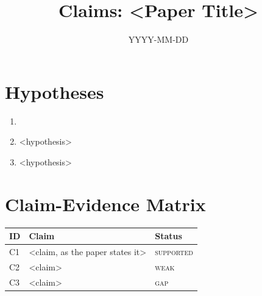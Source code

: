 \documentclass[11pt]{article}
\title{Claims: <Paper Title>}
\date{YYYY-MM-DD}
\newcommand{\status}[1]{\textsc{#1}}
\newcommand{\supported}{\textcolor{green!50!black}{\status{supported}}}
\newcommand{\weak}{\textcolor{orange!80!black}{\status{weak}}}
\newcommand{\gap}{\textcolor{red!70!black}{\status{gap}}}
\begin{document}
\maketitle

\section*{Hypotheses}

\begin{enumerate}
\item[\textbf{H1.}] <venue-neutral hypothesis statement>
\item[\textbf{H2.}] <hypothesis>
\item[\textbf{H3.}] <hypothesis>
\end{enumerate}

\section*{Claim-Evidence Matrix}

\begin{small}
\begin{tabularx}{\textwidth}{@{}p{}X p{}@{}}
\toprule
ID & Claim & Status \\
\midrule
C1 & <claim, as the paper states it> & \supported \\
\addlinespace
C2 & <claim> & \weak \\
\addlinespace
C3 & <claim> & \gap \\
\bottomrule
\end{tabularx}
\end{small}

\end{document}
